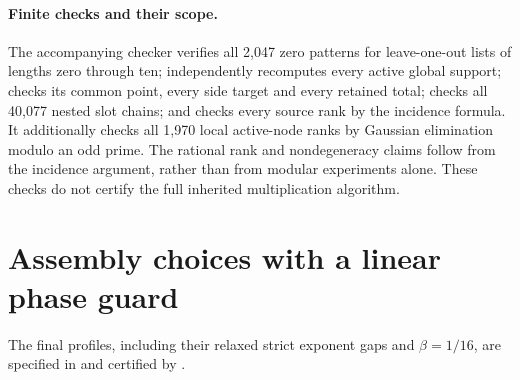 \paragraph{Finite checks and their scope.}
The accompanying checker verifies all 2,047 zero patterns for leave-one-out
lists of lengths zero through ten; independently recomputes every active global
support; checks its common point, every side target and every retained total;
checks all 40,077 nested slot chains; and checks every source rank by the incidence
formula. It additionally checks all 1,970 local active-node ranks by Gaussian
elimination modulo an odd prime. The rational rank and nondegeneracy claims
follow from the incidence argument, rather than from modular experiments alone.
These checks do not certify the full inherited multiplication algorithm.

\section{Assembly choices with a linear phase guard}
The final profiles, including their relaxed strict exponent gaps and $\beta=1/16$,
are specified in  and certified by
.
